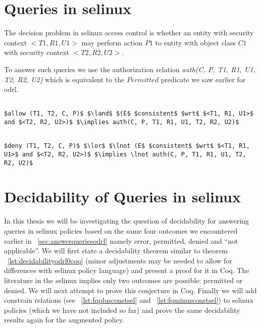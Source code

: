 \section{Queries in \ac{selinux}}

The decision problem in \ac{selinux} access control is whether an entity with security context $<T1, R1, U1>$ may perform action $P1$ to entity with object class $C1$ with security context $<T2, R2, U2>$.

To answer such queries we use the authorization relation \emph{auth(C, P, T1, R1, U1, T2, R2, U2)} which is equivalent to the $Permitted$ predicate we saw earlier for \ac{odrl}.

\lstset{mathescape, language=AST} 
\begin{lstlisting}[frame=single, caption={$f^{+}_q$ for \ac{selinux}},label={lst:fqplussel}]

$allow (T1, T2, C, P)$ $\land$ $(E$ $consistent$ $wrt$ $<T1, R1, U1>$ and $<T2, R2, U2>)$ $\implies auth(C, P, T1, R1, U1, T2, R2, U2)$ 

\end{lstlisting}

\lstset{mathescape, language=AST} 
\begin{lstlisting}[frame=single, caption={$f^{-}_q$ for \ac{selinux}},label={lst:fqminussel}]

$deny (T1, T2, C, P)$ $\lor$ $\lnot (E$ $consistent$ $wrt$ $<T1, R1, U1>$ and $<T2, R2, U2>)$ $\implies \lnot auth(C, P, T1, R1, U1, T2, R2, U2)$ 

\end{lstlisting}

\section{Decidability of Queries in \ac{selinux}}

In this thesis we will be investigating the question of decidability for answering queries in \ac{selinux} policies based on the same four outcomes we encountered earlier in ~\ref{sec:answerqueriesodrl} namely error, permitted, denied and ``not applicable''. We will first state a decidability theorem similar to theorem ~\ref{lst:decidabilityodrl0coq} (minor adjustments may be needed to allow for differences with \ac{selinux} policy language) and present a proof for it in Coq. The literature in the \ac{selinux} implies only two outcomes are possible: permitted or denied. We will next attempt to prove this conjecture in Coq. Finally we will add constrain relations (see ~\ref{lst:fqplusconstsel} and ~\ref{lst:fqminusconstsel}) to \ac{selinux} policies (which we have not included so far) and prove the same decidability results again for the augmented policy.

